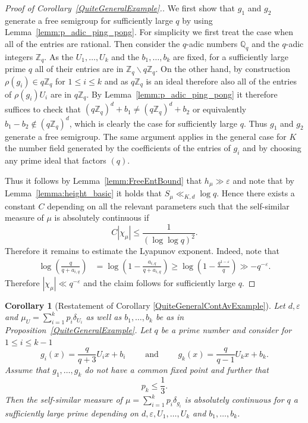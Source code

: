 \documentclass[10pt, english,oneside,reqno]{amsart}
\newtheorem*{corollary*}{Corollary}
\theoremstyle{plain}
\theoremstyle{remark}
\numberwithin{equation}{section}
\numberwithin{figure}{section}
\newcommand{\eps}{\varepsilon}
\newcommand{\Z}{\mathbb{Z}}
\newcommand{\Q}{\mathbb{Q}}
\begin{document}
\begin{proof}[Proof of Corollary~\ref{QuiteGeneralExample}.]
    We first show that $g_1$ and $g_2$ generate a free semigroup for sufficiently large $q$ by using Lemma~\ref{lemm:p_adic_ping_pong}. For simplicity we first treat the case when all of the entries are rational. Then consider the $q$-adic numbers $\Q_{q}$ and the $q$-adic integers $\Z_{q}$. As the $U_1, \ldots , U_k$ and the $b_1, \ldots , b_k$ are fixed, for a sufficiently large prime $q$ all of their entries are in $\Z_{q} \backslash q\Z_q$. On the other hand, by construction $\rho(g_i) \in q\Z_q$ for $1\leq i \leq k$ and as $q\Z_q$ is an ideal therefore also all of the entries of $\rho(g_i)U_i$ are in $q\Z_q$. By Lemma~\ref{lemm:p_adic_ping_pong} it therefore suffices to check that $(q\Z_q)^d + b_1 \neq (q\Z_q)^{d} + b_2$ or equivalently $b_1 - b_2 \not\in (q\Z_q)^d$, which is clearly the case for sufficiently large $q$. Thus $g_1$ and $g_2$ generate a free semigroup. The same argument applies in the general case for $K$ the number field generated by the coefficients of the entries of $g_i$ and by choosing any prime ideal that factors $(q)$.

    Thus it follows by Lemma~\ref{lemm:FreeEntBound} that $h_{\mu} \gg \eps$ and note that by Lemma~\ref{lemma:height_basic} it holds that $S_{\mu} \ll_{K,d} \log q$. Hence there exists a constant $C$ depending on all the relevant parameters such that the self-similar measure of $\mu$ is absolutely continuous if $$C|\chi_{\mu}| \leq \frac{1}{(\log \log q)^2}.$$ Therefore it remains to estimate the Lyapunov exponent. Indeed, note that 
    \begin{align*}
        \log\left( \frac{q}{q + a_{i,q}} \right) &= \log\left(1 - \frac{a_{i,q}}{q + a_{i,q}}\right) \geq \log\left(1 - \frac{q^{1 - \eps}}{q}\right) \gg -q^{-\eps}.
    \end{align*} Therefore $|\chi_{\mu}| \ll q^{-\eps}$ and the claim follows for sufficiently large $q$.
\end{proof}


\begin{corollary*}[Restatement of Corollary \ref{QuiteGeneralContAvExample}]
		Let $d, \eps$ and $\mu_U = \sum_{i = 1}^k p_i \delta_{U_i}$  as well as $b_1, \ldots , b_k$ be as in Proposition~\ref{QuiteGeneralExample}. Let $q$ be a prime number and  consider for $1 \leq i \leq k-1$ $$g_i(x) = \frac{q}{q+3}U_ix + b_i \quad \quad \text{ and } \quad \quad g_k(x) = \frac{q}{q-1}U_kx + b_k.$$ Assume that $g_1, \ldots , g_k$ do not have a common fixed point and further that $$p_k \leq \frac{1}{3}.$$ Then the self-similar measure of $\mu = \sum_{i = 1}^k p_i\delta_{g_i}$ is absolutely continuous for $q$ a sufficiently large prime depending on $d,\eps,U_1, \ldots , U_k$ and $b_1, \ldots , b_k$. 
	\end{corollary*}
\end{document}
